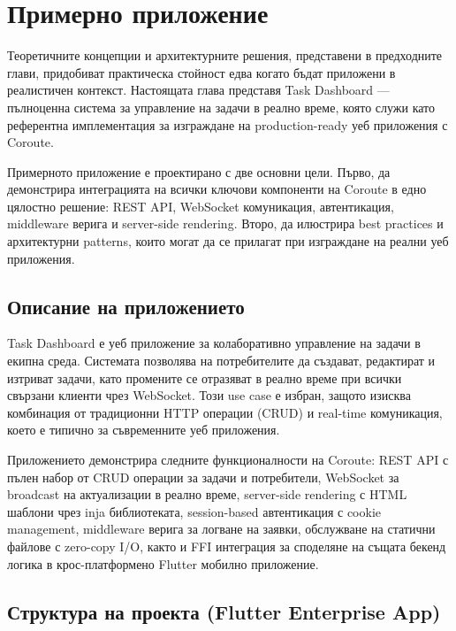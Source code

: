 \section{Примерно приложение}
\label{sec:example_app}

Теоретичните концепции и архитектурните решения, представени в предходните глави, придобиват практическа стойност едва когато бъдат приложени в реалистичен контекст. Настоящата глава представя Task Dashboard --- пълноценна система за управление на задачи в реално време, която служи като референтна имплементация за изграждане на production-ready уеб приложения с Coroute.

Примерното приложение е проектирано с две основни цели. Първо, да демонстрира интеграцията на всички ключови компоненти на Coroute в едно цялостно решение: REST API, WebSocket комуникация, автентикация, middleware верига и server-side rendering. Второ, да илюстрира best practices и архитектурни patterns, които могат да се прилагат при изграждане на реални уеб приложения.

\subsection{Описание на приложението}

Task Dashboard е уеб приложение за колаборативно управление на задачи в екипна среда. Системата позволява на потребителите да създават, редактират и изтриват задачи, като промените се отразяват в реално време при всички свързани клиенти чрез WebSocket. Този use case е избран, защото изисква комбинация от традиционни HTTP операции (CRUD) и real-time комуникация, което е типично за съвременните уеб приложения.

Приложението демонстрира следните функционалности на Coroute: REST API с пълен набор от CRUD операции за задачи и потребители, WebSocket за broadcast на актуализации в реално време, server-side rendering с HTML шаблони чрез inja библиотеката, session-based автентикация с cookie management, middleware верига за логване на заявки, обслужване на статични файлове с zero-copy I/O, както и FFI интеграция за споделяне на същата бекенд логика в крос-платформено Flutter мобилно приложение.

\subsection{Структура на проекта (Flutter Enterprise App)}

